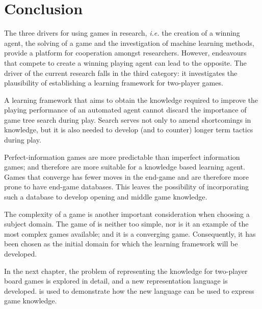 \section{Conclusion}
\label{sec:two-player-conclusion}
The three drivers for using games in research, {\it i.e.} the creation of a winning agent, the solving of a game and the investigation of machine learning methods, provide a platform for cooperation amongst researchers.  However, endeavours that compete to create a winning playing agent can lead to the opposite.  The driver of the current research falls in the third category: it investigates the plausibility of establishing a learning framework for two-player games.

A learning framework that aims to obtain the knowledge required to improve the playing performance of an automated agent cannot discard the importance of game tree search during play.  Search serves not only to amend shortcomings in knowledge, but it is also needed to develop (and to counter) longer term tactics during play.

Perfect-information games are more predictable than imperfect information games; and therefore are more suitable for a knowledge based learning agent.  Games that converge has fewer moves in the end-game and are therefore more prone to have end-game databases.  This leaves the possibility of incorporating such a database to develop opening and middle game knowledge.  

The complexity of a game is another important consideration when choosing a subject domain.  The game of  is neither too simple, nor is it an example of the most complex games available; and it is a converging game.  Consequently, it has been chosen as the initial domain for which the learning framework will be developed.

In the next chapter, the problem of representing the knowledge for two-player board games is explored in detail, and a new representation language is developed.  is used to demonstrate how the new language can be used to express game knowledge.



